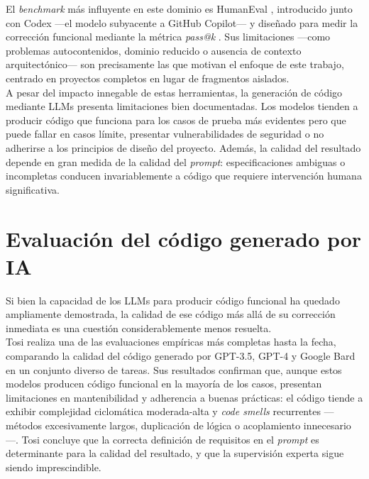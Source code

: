 El \textit{benchmark} más influyente en este dominio es HumanEval \cite{Chen:2021:Codex}, introducido junto con Codex ---el modelo subyacente a GitHub Copilot--- y diseñado para medir la corrección funcional mediante la métrica \textit{pass@k} \cite{Chen:2021:Codex}. Sus limitaciones ---como problemas autocontenidos, dominio reducido o ausencia de contexto arquitectónico--- son precisamente las que motivan el enfoque de este trabajo, centrado en proyectos completos en lugar de fragmentos aislados.\\

A pesar del impacto innegable de estas herramientas, la generación de código mediante \ac{LLMs} presenta limitaciones bien documentadas. Los modelos tienden a producir código que funciona para los casos de prueba más evidentes pero que puede fallar en casos límite, presentar vulnerabilidades de seguridad o no adherirse a los principios de diseño del proyecto. Además, la calidad del resultado depende en gran medida de la calidad del \textit{prompt}: especificaciones ambiguas o incompletas conducen invariablemente a código que requiere intervención humana significativa.

\section{Evaluación del código generado por IA} \label{sec:evaluacion-calidad}

Si bien la capacidad de los \ac{LLMs} para producir código funcional ha quedado ampliamente demostrada, la calidad de ese código más allá de su corrección inmediata es una cuestión considerablemente menos resuelta.\\

Tosi \cite{Tosi:2024:CodeQuality} realiza una de las evaluaciones empíricas más completas hasta la fecha, comparando la calidad del código generado por GPT-3.5, GPT-4 y Google Bard en un conjunto diverso de tareas. Sus resultados confirman que, aunque estos modelos producen código funcional en la mayoría de los casos, presentan limitaciones en mantenibilidad y adherencia a buenas prácticas: el código tiende a exhibir complejidad ciclomática moderada-alta y \textit{code smells} recurrentes ---métodos excesivamente largos, duplicación de lógica o acoplamiento innecesario---. Tosi concluye que la correcta definición de requisitos en el \textit{prompt} es determinante para la calidad del resultado, y que la supervisión experta sigue siendo imprescindible.\\

